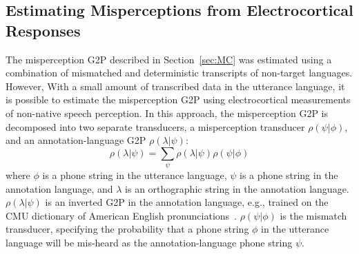 \subsection{Estimating Misperceptions from Electrocortical Responses}
\label{sec:eegchanmod}

The misperception G2P described in Section~\ref{sec:MC} was estimated
using a combination of mismatched and deterministic transcripts of
non-target languages. However, With a small amount
of transcribed data in the utterance language, it is possible
to estimate the misperception G2P using electrocortical measurements
of non-native speech perception. In this approach, the misperception G2P
is decomposed into two separate transducers,
a misperception transducer $\rho(\psi|\phi)$, and an
annotation-language G2P $\rho(\lambda|\psi)$:
\begin{equation}
  \rho(\lambda|\psi)=\sum_{\psi}\rho(\lambda|\psi)\rho(\psi|\phi)
\end{equation}
where $\phi$ is a phone string in the utterance language, $\psi$ is a
phone string in the annotation language, and $\lambda$ is an
orthographic string in the annotation language.  $\rho(\lambda|\psi)$
is an inverted G2P in the annotation language, e.g., trained on the
CMU dictionary of American English pronunciations~\cite{Lenzo1995}.
$\rho(\psi|\phi)$ is the mismatch transducer, specifying the
probability that a phone string $\phi$ in the utterance language will
be mis-heard as the annotation-language phone string $\psi$. 

